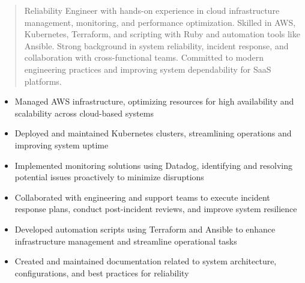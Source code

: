 



\makecvheader

\begin{quote}
  \noindent
  Reliability Engineer with hands-on experience in cloud infrastructure management, monitoring, and performance optimization. Skilled in AWS, Kubernetes, Terraform, and scripting with Ruby and automation tools like Ansible. Strong background in system reliability, incident response, and collaboration with cross-functional teams. Committed to modern engineering practices and improving system dependability for SaaS platforms.
\end{quote}

\par\smallskip
\noindent
\begin{minipage}{20cm}
  \begin{minipage}{9.75cm}
    \begin{itemize}
      \item Managed AWS infrastructure, optimizing resources for high availability and scalability across cloud-based systems
      \item Deployed and maintained Kubernetes clusters, streamlining operations and improving system uptime
      \item Implemented monitoring solutions using Datadog, identifying and resolving potential issues proactively to minimize disruptions
    \end{itemize}
  \end{minipage}
  \hfill
  \begin{minipage}{9.75cm}
    \begin{itemize}
      \item Collaborated with engineering and support teams to execute incident response plans, conduct post-incident reviews, and improve system resilience
      \item Developed automation scripts using Terraform and Ansible to enhance infrastructure management and streamline operational tasks
      \item Created and maintained documentation related to system architecture, configurations, and best practices for reliability
    \end{itemize}
  \end{minipage}
\end{minipage}
\par\smallskip
\divider

